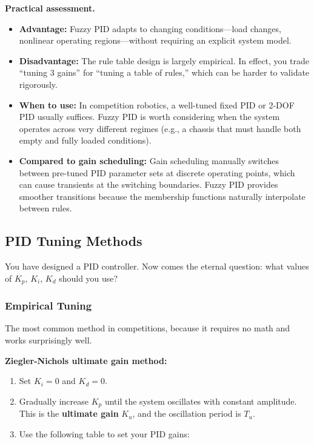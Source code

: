 \textbf{Practical assessment.}
\begin{itemize}
    \item \textbf{Advantage:} Fuzzy PID adapts to changing conditions---load changes, nonlinear operating regions---without requiring an explicit system model.
    \item \textbf{Disadvantage:} The rule table design is largely empirical. In effect, you trade ``tuning 3 gains'' for ``tuning a table of rules,'' which can be harder to validate rigorously.
    \item \textbf{When to use:} In competition robotics, a well-tuned fixed PID or 2-DOF PID usually suffices. Fuzzy PID is worth considering when the system operates across very different regimes (e.g., a chassis that must handle both empty and fully loaded conditions).
    \item \textbf{Compared to gain scheduling:} Gain scheduling manually switches between pre-tuned PID parameter sets at discrete operating points, which can cause transients at the switching boundaries. Fuzzy PID provides smoother transitions because the membership functions naturally interpolate between rules.
\end{itemize}

\subsection{PID Tuning Methods}

You have designed a PID controller. Now comes the eternal question: what values of $K_p$, $K_i$, $K_d$ should you use?

\subsubsection{Empirical Tuning}

The most common method in competitions, because it requires no math and works surprisingly well.

\textbf{Ziegler-Nichols ultimate gain method:}
\begin{enumerate}
    \item Set $K_i = 0$ and $K_d = 0$.
    \item Gradually increase $K_p$ until the system oscillates with constant amplitude. This is the \textbf{ultimate gain} $K_u$, and the oscillation period is $T_u$.
    \item Use the following table to set your PID gains:
\end{enumerate}

